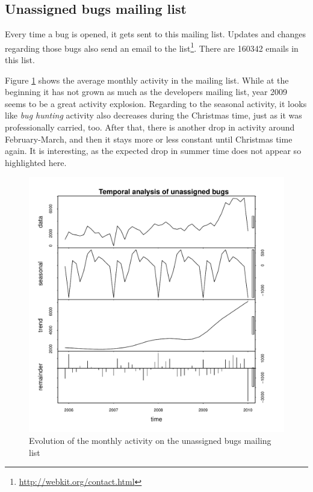 \subsection{Unassigned bugs mailing list}

Every time a bug is opened, it gets sent to this mailing list. Updates and changes regarding those bugs also send an email to the list\footnote{\url{http://webkit.org/contact.html}}. There are 160342 emails in this list. 

Figure \ref{bugs:evo:monthly} shows the average monthly activity in the mailing list. While at the beginning it has not grown as much as the developers mailing list, year 2009 seems to be a great activity explosion. Regarding to the seasonal activity, it looks like {\it bug hunting} activity also decreases during the Christmas time, just as it was professionally carried, too. After that, there is another drop in activity around February-March, and then it stays more or less constant until Christmas time again. It is interesting, as the expected drop in summer time does not appear so highlighted here.  

\begin{figure}[!hptb]
\includegraphics[width=400pt]{images/unassignedBugsByMonth.pdf}
\caption{Evolution of the monthly activity on the unassigned bugs mailing list}
\label{bugs:evo:monthly}
\end{figure}
